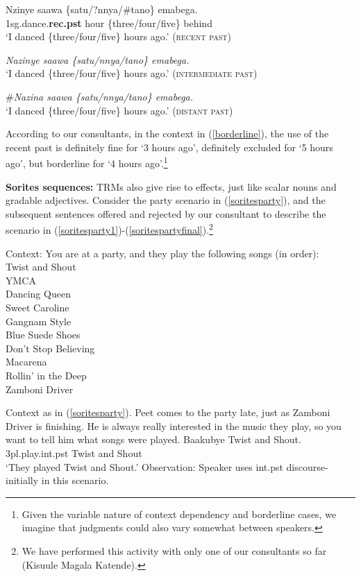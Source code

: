 \documentclass[output=paper,
modfonts
]{langscibook}
\begin{document}
\ea\label{borderline}
\gll Nzinye saawa \{satu/?nnya/\#tano\} emabega. \\
{\sc1sg}.dance{\sc.\textbf{rec.pst}} hour \{three/four/five\} behind \\
\glt `I danced \{three/four/five\} hours ago.' \hfill (\textsc{recent past})
\z

\ea\label{borderline.int} \textit{Nazinye saawa  \{satu/nnya/tano\} emabega.} \\
`I danced \{three/four/five\} hours ago.' \hfill (\textsc{intermediate past})
\z

\ea\label{borderline.dist} \#\textit{Nazina saawa  \{satu/nnya/tano\} emabega.} \\
`I danced \{three/four/five\} hours ago.' \hfill (\textsc{distant past})
\z


According to our consultants, in the context in (\ref{borderline}), the use of the recent past is definitely fine for `3 hours ago', definitely excluded for `5 hours ago', but borderline for `4 hours ago'.\footnote{Given the variable nature of context dependency and borderline cases, we imagine that judgments could also vary somewhat between speakers.}





{\bf Sorites sequences:}  TRMs also give rise to  effects, just like scalar nouns and gradable adjectives. Consider the party scenario in (\ref{soritesparty}), and the subsequent sentences offered and rejected by our consultant to describe the scenario in (\ref{soritesparty1})-(\ref{soritespartyfinal}).\footnote{We have performed this activity with only one of our consultants so far (Kisuule Magala Katende).}



\ea\label{soritesparty}
Context: You are at a party, and they play the following songs (in order): \\
Twist and Shout \\
YMCA \\
Dancing Queen \\
Sweet Caroline \\
Gangnam Style \\
Blue Suede Shoes \\
Don't Stop Believing \\
Macarena \\
Rollin' in the Deep \\
Zamboni Driver
\z

\ea\label{soritesparty1}
\ea Context as in (\ref{soritesparty}). Peet comes to the party late, just as Zamboni Driver is finishing. He is always really interested in the music they play, so you want to tell him what songs were played.
\ex\label{party1}
 \gll Baakubye Twist and Shout. \\
{\sc 3pl}.play{\sc.int.pst} Twist and Shout \\
\glt `They played Twist and Shout.' 
\ex Observation: Speaker uses {\sc int.pst} discourse-initially in this scenario.
\z
\z
\end{document}
